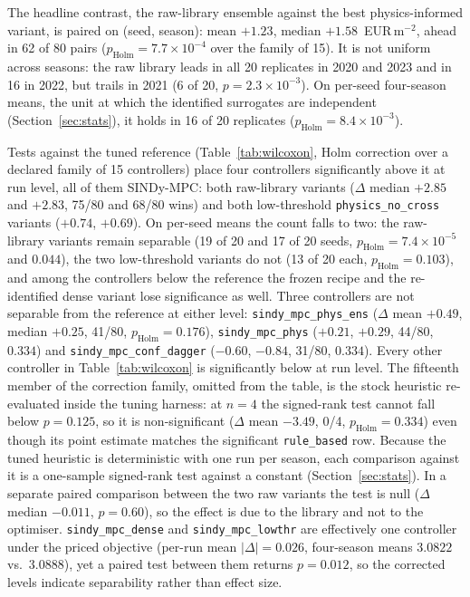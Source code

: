 The headline contrast, the raw-library ensemble against the best physics-informed
variant, is paired on (seed, season): mean $+1.23$, median $+1.58$~EUR\,m$^{-2}$, ahead in
62 of 80 pairs ($p_{\text{Holm}}=7.7\times10^{-4}$ over the family of 15). It is not
uniform across seasons: the raw library leads in all 20 replicates in 2020 and 2023 and in
16 in 2022, but trails in 2021 (6 of 20, $p=2.3\times10^{-3}$). On per-seed four-season
means, the unit at which the identified surrogates are independent
(Section~\ref{sec:stats}), it holds in 16 of 20 replicates ($p_{\text{Holm}}=8.4\times10^{-3}$).

Tests against the tuned reference (Table~\ref{tab:wilcoxon}, Holm correction over a
declared family of 15 controllers) place four controllers
significantly above it at run level, all of them SINDy-MPC: both raw-library variants
($\Delta$ median $+2.85$ and $+2.83$, 75/80 and 68/80 wins) and both low-threshold
\texttt{physics\_no\_cross} variants ($+0.74$, $+0.69$). On per-seed means the count
falls to two: the raw-library variants remain separable (19 of 20 and 17 of 20 seeds,
$p_{\text{Holm}}=7.4\times10^{-5}$ and $0.044$), the two low-threshold variants do not
(13 of 20 each, $p_{\text{Holm}}=0.103$), and among the controllers below the reference
the frozen recipe and the re-identified dense variant lose significance as well. Three
controllers are not separable from the reference at either level:
\texttt{sindy\_mpc\_phys\_ens} ($\Delta$ mean $+0.49$, median $+0.25$, 41/80,
$p_{\text{Holm}}=0.176$), \texttt{sindy\_mpc\_phys} ($+0.21$, $+0.29$, 44/80, $0.334$) and
\texttt{sindy\_mpc\_conf\_dagger} ($-0.60$, $-0.84$, 31/80, $0.334$). Every other
controller in Table~\ref{tab:wilcoxon} is significantly below at run level. The fifteenth member of the
correction family, omitted from the table, is the stock heuristic re-evaluated inside the
tuning harness: at $n=4$ the signed-rank test cannot fall below $p=0.125$, so it is
non-significant ($\Delta$ mean $-3.49$, 0/4, $p_{\text{Holm}}=0.334$) even though its point
estimate matches the significant \texttt{rule\_based} row.
Because the tuned heuristic is deterministic with one run per season, each comparison
against it is a one-sample signed-rank test against a constant (Section~\ref{sec:stats}).
In a separate
paired comparison between the two raw variants the test is null ($\Delta$ median $-0.011$,
$p=0.60$), so the effect is due to the library and not to the optimiser.
\texttt{sindy\_mpc\_dense} and \texttt{sindy\_mpc\_lowthr} are effectively one controller
under the priced objective (per-run mean $|\Delta|=0.026$, four-season means $3.0822$ vs.\
$3.0888$), yet a paired test between them returns $p=0.012$, so the corrected levels
indicate separability rather than effect size.

